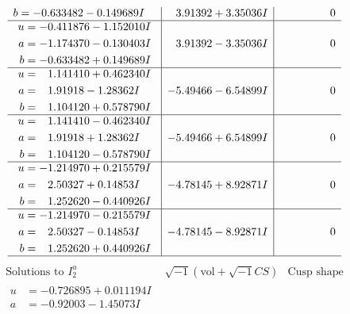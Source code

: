 \documentclass[1p]{elsarticle_modified}
\theoremstyle{definition}
\newcommand{\I}{\sqrt{-1}}
\begin{document}
$$\begin{array}{c|c|c}
\begin{aligned}
b &= -0.633482 - 0.149689 I\end{aligned}
 & \phantom{-}3.91392 + 3.35036 I & \phantom{-0.000000 } 0 \\ \hline\begin{aligned}
u &= -0.411876 - 1.152010 I \\
a &= -1.174370 - 0.130403 I \\
b &= -0.633482 + 0.149689 I\end{aligned}
 & \phantom{-}3.91392 - 3.35036 I & \phantom{-0.000000 } 0 \\ \hline\begin{aligned}
u &= \phantom{-}1.141410 + 0.462340 I \\
a &= \phantom{-}1.91918 - 1.28362 I \\
b &= \phantom{-}1.104120 + 0.578790 I\end{aligned}
 & -5.49466 - 6.54899 I & \phantom{-0.000000 } 0 \\ \hline\begin{aligned}
u &= \phantom{-}1.141410 - 0.462340 I \\
a &= \phantom{-}1.91918 + 1.28362 I \\
b &= \phantom{-}1.104120 - 0.578790 I\end{aligned}
 & -5.49466 + 6.54899 I & \phantom{-0.000000 } 0 \\ \hline\begin{aligned}
u &= -1.214970 + 0.215579 I \\
a &= \phantom{-}2.50327 + 0.14853 I \\
b &= \phantom{-}1.252620 - 0.440926 I\end{aligned}
 & -4.78145 + 8.92871 I & \phantom{-0.000000 } 0 \\ \hline\begin{aligned}
u &= -1.214970 - 0.215579 I \\
a &= \phantom{-}2.50327 - 0.14853 I \\
b &= \phantom{-}1.252620 + 0.440926 I\end{aligned}
 & -4.78145 - 8.92871 I & \phantom{-0.000000 } 0\\
 \hline 
 \end{array}$$\newpage$$\begin{array}{c|c|c}  
\text{Solutions to }I^u_{2}& \I (\text{vol} + \sqrt{-1}CS) & \text{Cusp shape}\\
 \hline 
\begin{aligned}
u &= -0.726895 + 0.011194 I \\
a &= -0.92003 - 1.45073 I \\

\end{aligned}
\end{array}$$
\end{document}
